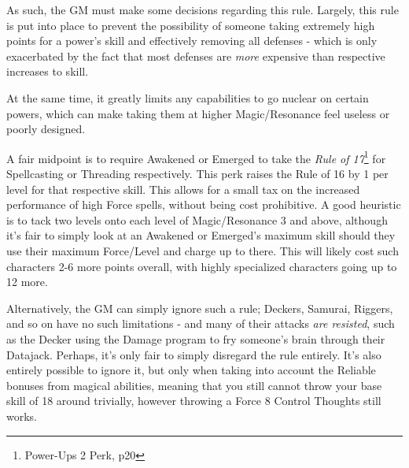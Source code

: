 \begin{multicols*}{3}
	As such, the GM must make some decisions regarding this rule. Largely, this rule is put into place to prevent the possibility of someone taking extremely high points for a power's skill and effectively removing all defenses - which is only exacerbated by the fact that most defenses are \textit{more} expensive than respective increases to skill.
	
	At the same time, it greatly limits any capabilities to go nuclear on certain powers, which can make taking them at higher Magic/Resonance feel useless or poorly designed.
	
	A fair midpoint is to require Awakened or Emerged to take the \textit{Rule of 17}\footnote{Power-Ups 2 Perk, p20} for Spellcasting or Threading respectively. This perk raises the Rule of 16 by 1 per level for that respective skill. This allows for a small tax on the increased performance of high Force spells, without being cost prohibitive. A good heuristic is to tack two levels onto each level of Magic/Resonance 3 and above, although it's fair to simply look at an Awakened or Emerged's maximum skill should they use their maximum Force/Level and charge up to there. This will likely cost such characters 2-6 more points overall, with highly specialized characters going up to 12 more.
	
	Alternatively, the GM can simply ignore such a rule; Deckers, Samurai, Riggers, and so on have no such limitations - and many of their attacks \textit{are resisted}, such as the Decker using the Damage program to fry someone's brain through their Datajack. Perhaps, it's only fair to simply disregard the rule entirely. It's also entirely possible to ignore it, but only when taking into account the Reliable bonuses from magical abilities, meaning that you still cannot throw your base skill of 18 around trivially, however throwing a Force 8 Control Thoughts still works.
	
\end{multicols*}